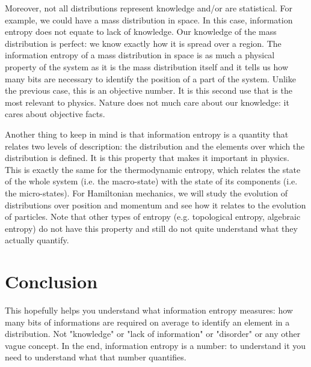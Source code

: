 \documentclass[aps,pra,10pt,floatfix,nofootinbib]{revtex4-1}
\theoremstyle{definition}
\begin{document}
Moreover, not all distributions represent knowledge and/or are statistical. For example, we could have a mass distribution in space. In this case, information entropy does not equate to lack of knowledge. Our knowledge of the mass distribution is perfect: we know exactly how it is spread over a region. The information entropy of a mass distribution in space is as much a physical property of the system as it is the mass distribution itself and it tells us how many bits are necessary to identify the position of a part of the system. Unlike the previous case, this is an objective number. It is this second use that is the most relevant to physics. Nature does not much care about our knowledge: it cares about objective facts.

Another thing to keep in mind is that information entropy is a quantity that relates two levels of description: the distribution and the elements over which the distribution is defined. It is this property that makes it important in physics. This is exactly the same for the thermodynamic entropy, which relates the state of the whole system (i.e. the macro-state) with the state of its components (i.e. the micro-states). For Hamiltonian mechanics, we will study the evolution of distributions over position and momentum and see how it relates to the evolution of particles. Note that other types of entropy (e.g. topological entropy, algebraic entropy) do not have this property and still do not quite understand what they actually quantify.

\section{Conclusion}

This hopefully helps you understand what information entropy measures: how many bits of informations are required on average to identify an element in a distribution. Not "knowledge" or "lack of information" or "disorder" or any other vague concept. In the end, information entropy is a number: to understand it you need to understand what that number quantifies.
\end{document}
